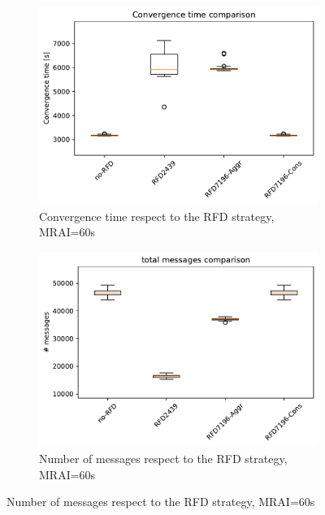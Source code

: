 \begin{figure}[H]
\begin{subfigure}[b]{0.325\textwidth}
         \label{fig:1000_RFD_MRAI30_suppressions_mice}
     \end{subfigure}
     \vfill
     \begin{subfigure}[b]{0.325\textwidth}
         \centering
         \includegraphics[width=\textwidth]{images/RFD/miceVSelephants/MultiMRAI/60/mice/cisco_1000MRAI60_rfd_comparison_time_boxplot.pdf}
         \caption{Convergence time respect to the RFD strategy, MRAI=60s}
         \label{fig:1000_RFD_MRAI30_time_mice}
     \end{subfigure}
     \hfill
     \begin{subfigure}[b]{0.325\textwidth}
         \centering
         \includegraphics[width=\textwidth]{images/RFD/miceVSelephants/MultiMRAI/60/mice/cisco_1000MRAI60_rfd_comparison_messages_boxplot.pdf}
         \caption{Number of messages respect to the RFD strategy, MRAI=60s}

\end{subfigure}
\end{figure}
